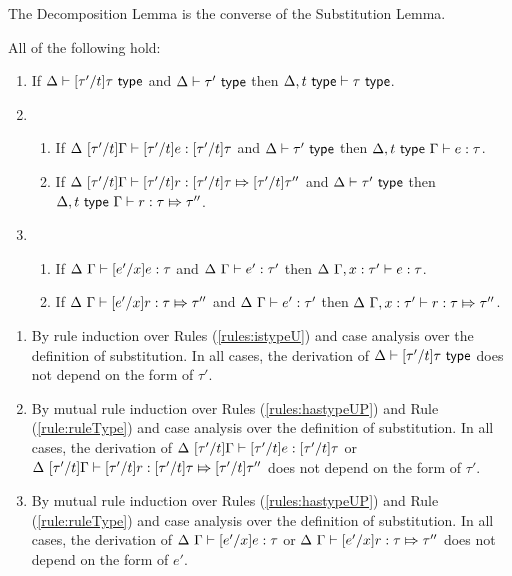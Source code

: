 {{{{The Decomposition Lemma is the converse of the Substitution Lemma.
\begin{lemma}[Decomposition]\label{lemma:decomposition-UP} All of the following hold:
\begin{enumerate}
\item If $\Delta \vdash [\tau'/t]\tau~\mathsf{type}$ and $\Delta \vdash \tau'~\mathsf{type}$ then $\Delta, t~\mathsf{type} \vdash \tau~\mathsf{type}$.
\item \begin{enumerate}
  \item If $\Delta~[\tau'/t]\Gamma \vdash [\tau'/t]e : [\tau'/t]\tau$ and $\Delta \vdash \tau'~\mathsf{type}$ then $\Delta, t~\mathsf{type}~\Gamma \vdash e : \tau$.
  \item If $\Delta~[\tau'/t]\Gamma \vdash [\tau'/t]r : [\tau'/t]\tau \Mapsto [\tau'/t]\tau''$ and $\Delta \vdash \tau'~\mathsf{type}$ then $\Delta, t~\mathsf{type}~\Gamma \vdash r : \tau \Mapsto \tau''$.
  \end{enumerate}
\item \begin{enumerate}
  \item If $\Delta~\Gamma \vdash [e'/x]e : \tau$ and $\Delta~\Gamma \vdash e' : \tau'$ then $\Delta~\Gamma, x : \tau' \vdash e : \tau$.
  \item If $\Delta~\Gamma \vdash [e'/x]r : \tau \Mapsto \tau''$ and $\Delta~\Gamma \vdash e' : \tau'$ then $\Delta~\Gamma, x : \tau' \vdash r : \tau \Mapsto \tau''$.
  \end{enumerate}
\end{enumerate}\end{lemma}
\begin{proof-sketch}
\begin{enumerate}
\item By rule induction over Rules (\ref{rules:istypeU}) and case analysis over the definition of substitution. In all cases, the derivation of $\Delta \vdash [\tau'/t]\tau~\mathsf{type}$ does not depend on the form of $\tau'$.
\item By mutual rule induction over Rules (\ref{rules:hastypeUP}) and Rule (\ref{rule:ruleType}) and case analysis over the definition of substitution. In all cases, the derivation of $\Delta~[\tau'/t]\Gamma \vdash [\tau'/t]e : [\tau'/t]\tau$ or $\Delta~[\tau'/t]\Gamma \vdash [\tau'/t]r : [\tau'/t]\tau \Mapsto [\tau'/t]\tau''$ does not depend on the form of $\tau'$.
\item By mutual rule induction over Rules (\ref{rules:hastypeUP}) and Rule (\ref{rule:ruleType}) and case analysis over the definition of substitution. In all cases, the derivation of $\Delta~\Gamma \vdash [e'/x]e : \tau$ or $\Delta~\Gamma \vdash [e'/x]r : \tau \Mapsto \tau''$ does not depend on the form of $e'$.
\end{enumerate}
\end{proof-sketch}

}}}}
